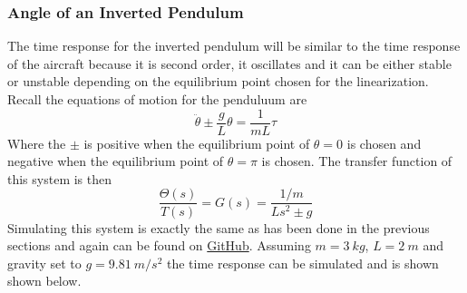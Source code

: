 \subsubsection{Angle of an Inverted Pendulum}

The time response for the inverted pendulum will be similar to the time response of the aircraft because it is second order, it oscillates and it can be either stable or unstable depending on the equilibrium point chosen for the linearization. Recall the equations of motion for the penduluum are 
\begin{equation}
    \ddot{\theta} \pm \frac{g}{L}\theta = \frac{1}{mL} \tau
\end{equation}
Where the $\pm$ is positive when the equilibrium point of $\theta=0$ is chosen and negative when the equilibrium point of $\theta=\pi$ is chosen. The transfer function of this system is then
\begin{equation}
  \frac{\Theta(s)}{T(s)} = G(s) = \frac{1/m}{Ls^2 \pm g}
\end{equation}
Simulating this system is exactly the same as has been done in the previous sections and again can be found on \href{https://github.com/cmontalvo251/Python/blob/master/controls/pendulum.py}{GitHub}. Assuming $m=3~kg$, $L=2~m$ and gravity set to $g=9.81~m/s^2$ the time response can be simulated and is shown shown below.
